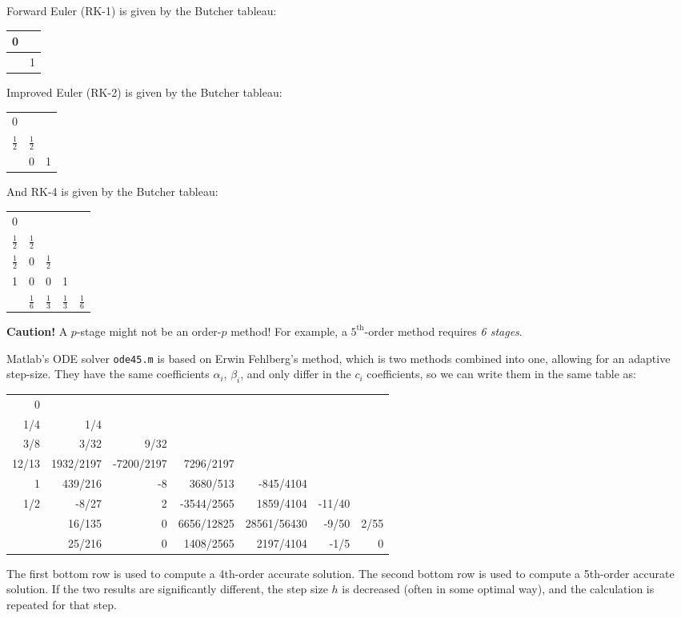 \documentclass[10pt,reqno]{amsart}
\theoremstyle{plain}
\theoremstyle{definition}
\theoremstyle{remark}
\numberwithin{figure}{section}   %
\begin{document}
Forward Euler (RK-1) is given by the Butcher tableau:
\begin{center}
\begin{tabular}{l|l}
0 &  \\
\hline
  & 1
\end{tabular}
\end{center}
Improved Euler (RK-2) is given by the Butcher tableau:
\begin{center}
\begin{tabular}{l|ll}
0 &  \\
$\tfrac{1}{2}$ & $\tfrac{1}{2}$ \\
\hline
  & 0 & 1
\end{tabular}
\end{center}
And RK-4 is given by the Butcher tableau:
\begin{center}
\begin{tabular}{l|llll}
0 & & & & \\
$\tfrac{1}{2}$ & $\tfrac{1}{2}$  &\\
$\tfrac{1}{2}$ & 0 & $\tfrac{1}{2}$ \\
1 & 0 & 0 & 1 \\
\hline
  & $\tfrac{1}{6}$ & $\tfrac{1}{3}$  & $\tfrac{1}{3}$  & $\tfrac{1}{6}$
\end{tabular}
\end{center}

\noindent
\textbf{Caution!} A $p$-stage might not be an order-$p$ method!  For example, a $5^{\text{th}}$-order method requires \textit{6 stages}.

Matlab's ODE solver \texttt{ode45.m} is based on Erwin Fehlberg's method, which is two methods combined into one, allowing for an adaptive step-size.  They have the same coefficients $\alpha_i$, $\beta_i$, and only differ in the $c_i$ coefficients, so we can write them in the same table as:
 
 \begin{center}
\begin{tabular}{r|rrrrrr}
0&\\
 1/4 & 1/4\\
3/8 & 3/32 & 9/32\\
12/13  & 1932/2197 & -7200/2197 & 7296/2197\\
1  & 439/216 & -8 & 3680/513 & -845/4104\\
1/2 &-8/27 &2 &-3544/2565 &1859/4104 &-11/40 &\\
\hline
& 16/135 & 0 & 6656/12825 & 28561/56430 & -9/50 & 2/55 \\
& 25/216 & 0 & 1408/2565 & 2197/4104 & -1/5 & 0
\end{tabular}
\end{center}
The first bottom row is used to compute a 4th-order accurate solution.  The second bottom  row is used to compute a 5th-order accurate solution.  If the two results are significantly different, the step size $h$ is decreased (often in some optimal way), and the calculation is repeated for that step.
\end{document}
